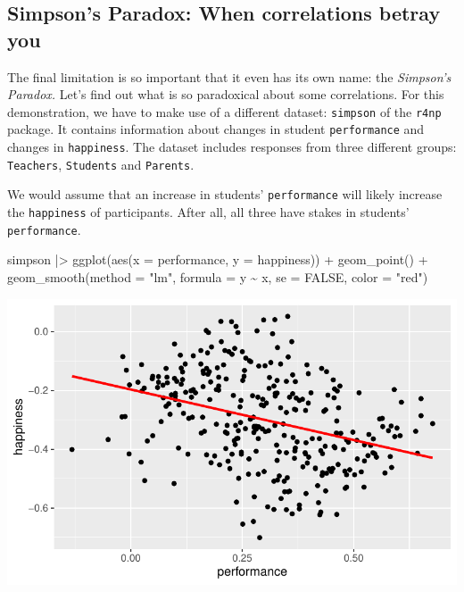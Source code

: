 \documentclass[
  letterpaper,
]{krantz}
\makeatletter
\newenvironment{Shaded}{\begin{snugshade}}{\end{snugshade}}
\newcommand{\AttributeTok}[1]{\textcolor[rgb]{0.40,0.45,0.13}{#1}}
\newcommand{\ConstantTok}[1]{\textcolor[rgb]{0.56,0.35,0.01}{#1}}
\newcommand{\FunctionTok}[1]{\textcolor[rgb]{0.28,0.35,0.67}{#1}}
\newcommand{\NormalTok}[1]{\textcolor[rgb]{0.00,0.23,0.31}{#1}}
\newcommand{\SpecialCharTok}[1]{\textcolor[rgb]{0.37,0.37,0.37}{#1}}
\newcommand{\StringTok}[1]{\textcolor[rgb]{0.13,0.47,0.30}{#1}}
\newenvironment{kframe}{%
\medskip{}
\setlength{\fboxsep}{.8em}
 \def\at@end@of@kframe{}%
 \ifinner\ifhmode%
  \def\at@end@of@kframe{\end{minipage}}%
  \begin{minipage}{\columnwidth}%
 \fi\fi%
 \def\FrameCommand##1{\hskip\@totalleftmargin \hskip-\fboxsep
 \colorbox{shadecolor}{##1}\hskip-\fboxsep
     \hskip-\linewidth \hskip-\@totalleftmargin \hskip\columnwidth}%
 \MakeFramed {\advance\hsize-\width
   \@totalleftmargin\z@ \linewidth\hsize
   \@setminipage}}%
 {\par\unskip\endMakeFramed%
 \at@end@of@kframe}
\renewenvironment{Shaded}{\begin{kframe}}{\end{kframe}}
\makeatother
\begin{document}
\subsection{Simpson's Paradox: When correlations betray
you}\label{sec-simpsons-paradox}

The final limitation is so important that it even has its own name: the
\emph{Simpson's Paradox.} Let's find out what is so paradoxical about
some correlations. For this demonstration, we have to make use of a
different dataset: \texttt{simpson} of the \texttt{r4np} package. It
contains information about changes in student \texttt{performance} and
changes in \texttt{happiness}. The dataset includes responses from three
different groups: \texttt{Teachers}, \texttt{Students} and
\texttt{Parents}.

We would assume that an increase in students' \texttt{performance} will
likely increase the \texttt{happiness} of participants. After all, all
three have stakes in students' \texttt{performance}.

\begin{Shaded}
\begin{Highlighting}[]
\NormalTok{simpson }\SpecialCharTok{|\textgreater{}}
  \FunctionTok{ggplot}\NormalTok{(}\FunctionTok{aes}\NormalTok{(}\AttributeTok{x =}\NormalTok{ performance,}
             \AttributeTok{y =}\NormalTok{ happiness)) }\SpecialCharTok{+}
  \FunctionTok{geom\_point}\NormalTok{() }\SpecialCharTok{+}
  \FunctionTok{geom\_smooth}\NormalTok{(}\AttributeTok{method =} \StringTok{"lm"}\NormalTok{,}
              \AttributeTok{formula =}\NormalTok{ y }\SpecialCharTok{\textasciitilde{}}\NormalTok{ x,}
              \AttributeTok{se =} \ConstantTok{FALSE}\NormalTok{,}
              \AttributeTok{color =} \StringTok{"red"}\NormalTok{)}
\end{Highlighting}
\end{Shaded}

\includegraphics{10_correlations_files/figure-latex/simpson-paradox-plot-1.pdf}
\end{document}
